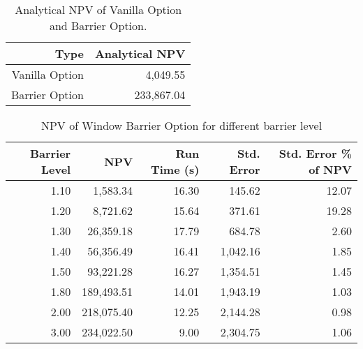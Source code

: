 \begin{table}[!htbp]
  \centering
  \begin{tabular}{r | r}
    Type & Analytical NPV \\ \hline
    Vanilla Option & 4,049.55 \\
    Barrier Option & 233,867.04
  \end{tabular}
  \caption{Analytical NPV of Vanilla Option and Barrier Option.}
  \label{window_barrier_analytical_npv}
\end{table}



\begin{table}[!htbp]
  \centering
  \begin{tabular}{r | r | r | r | r}
    Barrier Level & NPV & Run Time (s) & Std. Error & Std. Error \% of NPV \\ \hline
    1.10 & 1,583.34 & 16.30 & 145.62 & 12.07 \\
    1.20 & 8,721.62 & 15.64 & 371.61 & 19.28 \\
    1.30 & 26,359.18 & 17.79 & 684.78 & 2.60 \\
    1.40 & 56,356.49 & 16.41 & 1,042.16 & 1.85 \\
    1.50 & 93,221.28 & 16.27 & 1,354.51 & 1.45 \\
    1.80 & 189,493.51 & 14.01 & 1,943.19 & 1.03 \\
    2.00 & 218,075.40 & 12.25 & 2,144.28 & 0.98 \\
    3.00 & 234,022.50 & 9.00 & 2,304.75 & 1.06
  \end{tabular}
  \caption{NPV of Window Barrier Option for different barrier level}
  \label{window_barrier_npv_level_convergence}
\end{table}
